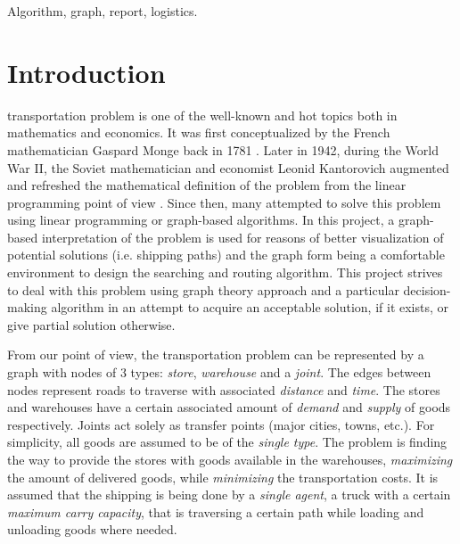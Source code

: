 \documentclass[journal,onecolumn]{IEEEtran}
\begin{document}
\begin{IEEEkeywords}
Algorithm, graph, report, logistics.
\end{IEEEkeywords}

%
\IEEEpeerreviewmaketitle



\section{Introduction}
 transportation problem is one of the well-known and hot topics both in mathematics and economics.
It was first conceptualized by the French mathematician Gaspard Monge back in 1781 \cite{monge:monge}. Later in 1942, during the World War II, the Soviet mathematician and economist Leonid Kantorovich augmented and refreshed the mathematical definition of the problem from the linear programming point of view \cite{kanto:kanto}. Since then, many attempted to solve this problem using linear programming or graph-based algorithms. In this project, a graph-based interpretation of the problem is used for reasons of better visualization of potential solutions (i.e. shipping paths) and the graph form being a comfortable environment to design the searching and routing algorithm. This project strives to deal with this problem using graph theory approach and a particular decision-making algorithm in an attempt to acquire an acceptable solution, if it exists, or give partial solution otherwise.

From our point of view, the transportation problem can be represented by a graph with nodes of 3 types: \textit{store}, \textit{warehouse} and a \textit{joint}. The edges between nodes represent roads to traverse with associated \textit{distance} and \textit{time}. The stores and warehouses have a certain associated amount of \textit{demand} and \textit{supply} of goods respectively. Joints act solely as transfer points (major cities, towns, etc.). For simplicity, all goods are assumed to be of the \textit{single type}. The problem is finding the way to provide the stores with goods available in the warehouses, \textit{maximizing} the amount of delivered goods, while \textit{minimizing} the transportation costs. It is assumed that the shipping is being done by a \textit{single agent}, a truck with a certain \textit{maximum carry capacity}, that is traversing a certain path while loading and unloading goods where needed.
\end{document}
